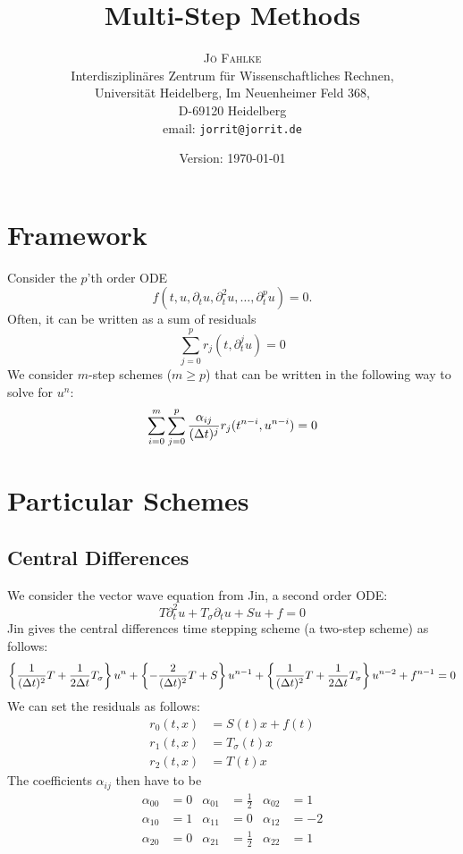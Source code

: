 \documentclass[11pt,a4paper,DIV11,%
notitlepage,oneside,abstracton,%
bibtotoc]{scrartcl}
\title{Multi-Step Methods}
\author{\textsc{Jö Fahlke}\\
Interdisziplinäres Zentrum für Wissenschaftliches Rechnen,\\
 Universität Heidelberg, Im Neuenheimer Feld 368, \\
D-69120 Heidelberg\\
email: \texttt{jorrit@jorrit.de}
}
\date{Version: \today}
\begin{document}
\maketitle


\tableofcontents

\section{Framework}

Consider the $p$'th order ODE
\begin{equation}
  f(t,u,\partial_tu,\partial_t^2u,\ldots,\partial_t^pu)=0.
\end{equation}
Often, it can be written as a sum of residuals
\begin{equation}
  \sum_{j=0}^pr_j(t,\partial_t^ju)=0
\end{equation}
We consider $m$-step schemes ($m\geq p$) that can be written in the following
way to solve for $u^n$:
\begin{equation}
  \sum_{i=0}^m\sum_{j=0}^p{\alpha_{ij} \over (\Delta t)^j}r_j(t^{n-i},u^{n-i})=0
\end{equation}

\section{Particular Schemes}

\subsection{Central Differences}

We consider the vector wave equation from Jin, a second order ODE:
\begin{equation}
  T\partial_t^2u+T_\sigma\partial_tu+Su+f=0
\end{equation}
Jin gives the central differences time stepping scheme (a two-step scheme) as
follows:
\begin{equation}
  \left\{{1 \over (\Delta t)^2} T + {1 \over 2\Delta t} T_\sigma \right\} u^n
  +\left\{-{2 \over (\Delta t)^2} T + S \right\} u^{n-1}
  +\left\{{1 \over (\Delta t)^2} T + {1 \over 2\Delta t} T_\sigma \right\} u^{n-2}
  +f^{n-1} = 0
\end{equation}
We can set the residuals as follows:
\begin{align}
  r_0(t,x)&=S(t)x+f(t) \\
  r_1(t,x)&=T_\sigma(t)x \\
  r_2(t,x)&=T(t)x
\end{align}
The coefficients $\alpha_{ij}$ then have to be
\begin{align}
  \alpha_{00}&=0 & \alpha_{01}&=\frac12 & \alpha_{02}&=1 \\
  \alpha_{10}&=1 & \alpha_{11}&=0       & \alpha_{12}&=-2 \\
  \alpha_{20}&=0 & \alpha_{21}&=\frac12 & \alpha_{22}&=1
\end{align}
\end{document}

